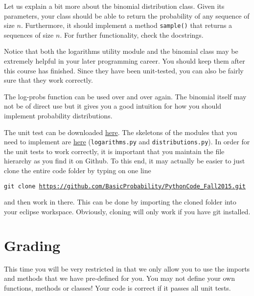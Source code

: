 \documentclass[11pt, leqno, a4paper]{article}
\begin{document}
Let us explain a bit more about the binomial distribution class. Given its parameters, your
class should be able to return the probability of any sequence of size $ n $. Furthermore,
it should implement a method \texttt{sample()} that returns a sequences of size $ n $. For further 
functionality, check the docstrings.

Notice that both the logarithms utility module and the binomial class may be extremely helpful in your later
programming career. You should keep them after this course has finished. Since they have been unit-tested,
you can also be fairly sure that they work correctly.

The log-probs function can be used over and over again. The binomial itself may not be of direct use but
it gives you a good intuition for how you should implement probability distributions.

The unit test can be downloaded 
\href{https://github.com/BasicProbability/PythonCode_Fall2015/tree/master/test/week4_debugging_and_testing}{here}. The skeletons of the modules that you need to implement are 
\href{https://github.com/BasicProbability/PythonCode_Fall2015/tree/master/src/week4_debugging_and_testing}{here} (\texttt{logarithms.py} and \texttt{distributions.py}). In order for the unit tests to work correctly, it is important that you maintain the file
hierarchy as you find it on Github. To this end, it may actually be easier to just clone the entire 
code folder by typing on one line
\begin{center}
\texttt{git clone \url{https://github.com/BasicProbability/PythonCode_Fall2015.git}}
\end{center}
and then work in there. This can be done by importing the cloned folder into your eclipse workspace.
Obviously, cloning will only work if you have git installed.

\section{Grading}
This time you will be very restricted in that we only allow you to use the imports and methods that
we have pre-defined for you. You may not define your own functions, methods or classes! Your code
is correct if it passes all unit tests.
\end{document}
